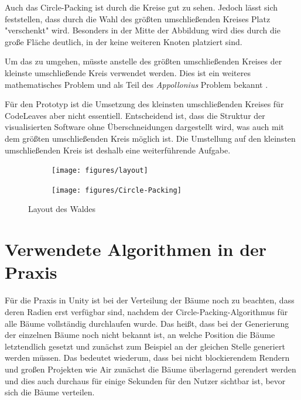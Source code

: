 Auch das Circle-Packing ist durch die Kreise gut zu sehen. Jedoch lässt sich feststellen, dass durch die Wahl des größten umschließenden Kreises Platz "verschenkt" wird. Besonders in der Mitte der Abbildung wird dies durch die große Fläche deutlich, in der keine weiteren Knoten platziert sind.

Um das zu umgehen, müsste anstelle des größten umschließenden Kreises der kleinste umschließende Kreis verwendet werden. Dies ist ein weiteres mathematisches Problem und als Teil des \textit{Appollonius} Problem bekannt \cite{dergiades2007soddy}.

Für den Prototyp ist die Umsetzung des kleinsten umschließenden Kreises für CodeLeaves aber nicht essentiell. Entscheidend ist, dass die Struktur der visualisierten Software ohne Überschneidungen dargestellt wird, was auch mit dem größten umschließenden Kreis möglich ist. Die Umstellung auf den kleinsten umschließenden Kreis ist deshalb eine weiterführende Aufgabe.

\begin{figure}[htbp]
  \centering
  \begin{subfigure}[t]{\textwidth}
    \centering
    \texttt{[image: figures/layout]}
     \label{fig:layout-side}
  \end{subfigure}
  \par\bigskip
  \begin{subfigure}[t]{\textwidth}
    \centering
  	\texttt{[image: figures/Circle-Packing]}
  	 \label{fig:layout-top}
  \end{subfigure}
  \caption{Layout des Waldes} \label{fig:layout}
\end{figure}

\section{Verwendete Algorithmen in der Praxis}

Für die Praxis in Unity ist bei der Verteilung der Bäume noch zu beachten, dass deren Radien erst verfügbar sind, nachdem der Circle-Packing-Algorithmus für alle Bäume vollständig durchlaufen wurde. Das heißt, dass bei der Generierung der einzelnen Bäume noch nicht bekannt ist, an welche Position die Bäume letztendlich gesetzt und zunächst zum Beispiel an der gleichen Stelle generiert werden müssen. Das bedeutet wiederum, dass bei nicht blockierendem Rendern und großen Projekten wie Air zunächst die Bäume überlagernd gerendert werden und dies auch durchaus für einige Sekunden für den Nutzer sichtbar ist, bevor sich die Bäume verteilen.

